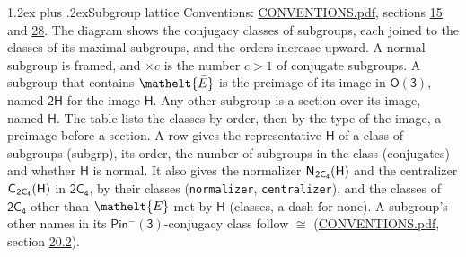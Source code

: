\documentclass[10pt,a4paper]{article}
\makeatletter
\renewcommand\section{\@startsection{section}{1}{\z@}{-3ex plus -1ex minus -.2ex}%
  {1.2ex plus .2ex}{\normalfont\large\sffamily\bfseries\color{parttitle}}}
\numberwithin{equation}{section}
\newcommand{\eltfont}[1]{{\let\sigma\eltsigma\mathelt{#1}}}
\newcommand{\grp}[1]{\mathsf{#1}}
\newcommand{\cls}[1]{\eltfont{#1}}
\newcommand{\elt}[1]{\eltfont{#1}}
\newcommand{\samecls}{\cong}
\newcommand{\barred}[1]{\bar{#1}}
\newcommand{\hairsp}{\mkern1mu}
\makeatother
\begin{document}
\section{Subgroup lattice}\label{s:subgroups}
Conventions: \href{../../CONVENTIONS.pdf}{CONVENTIONS.pdf}, sections \href{../../../rotation/CONVENTIONS.pdf\#conv.15}{15} and \href{../../CONVENTIONS.pdf\#conv.28}{28}.
The diagram shows the conjugacy classes of subgroups, each joined to the classes of its maximal subgroups, and the orders increase upward. \label{n:index.conjugates.c}A normal subgroup is framed, and ${\times}c$ is the number $c > 1$ of conjugate subgroups. \label{n:group.H}A subgroup that contains $\elt{\barred{E}}$ is the preimage of its image in $\grp{O(3)}$, named $\grp{2H}$ for the image $\grp{H}$. Any other subgroup is a section over its image, named $\grp{H}$. The table lists the classes by order, then by the type of the image, a preimage before a section. \label{n:head.subgroup}\label{n:head.order}\label{n:head.conjugates}\label{n:head.normal}A row gives the representative $\grp{H}$ of a class of subgroups (subgrp), its order, the number of subgroups in the class (conjugates) and whether $\grp{H}$ is normal. \label{n:group.normalizer}\label{n:group.centralizer}\label{n:head.classes}It also gives the normalizer $\grp{N}_{\hairsp \grp{2C_{4}}}(\grp{H})$ and the centralizer $\grp{C}_{\hairsp \grp{2C_{4}}}(\grp{H})$ in $\grp{2C_{4}}$, by their classes (\texttt{normalizer}, \texttt{centralizer}), and the classes of $\grp{2C_{4}}$ other than $\cls{E}$ met by $\grp{H}$ (classes, a dash for none). A subgroup's other names in its \href{Pinminus3.pdf}{$\grp{Pin^{-}(3)}$}-conjugacy class follow $\samecls$ (\href{../../CONVENTIONS.pdf}{CONVENTIONS.pdf}, section \href{../../CONVENTIONS.pdf\#conv.20.2}{20.2}).
\begin{center}
\end{center}
\end{document}
